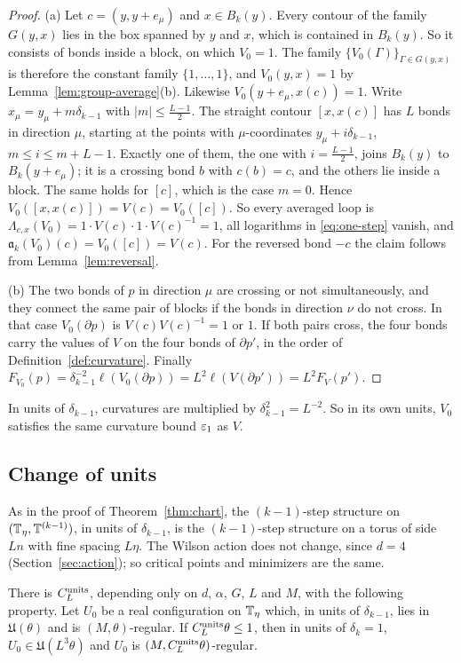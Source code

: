\begin{proof}
(a) Let $c=(y,y+e_\mu)$ and $x\in B_k(y)$. Every contour of the family $G(y,x)$ lies in the box spanned by $y$ and $x$, which is contained in $B_k(y)$. So it consists of bonds inside a block, on which $V_0=1$. The family $\{V_0(\Gamma)\}_{\Gamma\in G(y,x)}$ is therefore the constant family $\{1,\dots,1\}$, and $V_0(y,x)=1$ by Lemma~\ref{lem:group-average}(b). Likewise $V_0(y+e_\mu,x(c))=1$. Write $x_\mu=y_\mu+m\delta_{k-1}$ with $|m|\le\frac{L-1}2$. The straight contour $[x,x(c)]$ has $L$ bonds in direction $\mu$, starting at the points with $\mu$-coordinates $y_\mu+i\delta_{k-1}$, $m\le i\le m+L-1$. Exactly one of them, the one with $i=\frac{L-1}2$, joins $B_k(y)$ to $B_k(y+e_\mu)$; it is a crossing bond $b$ with $c(b)=c$, and the others lie inside a block. The same holds for $[c]$, which is the case $m=0$. Hence $V_0([x,x(c)])=V(c)=V_0([c])$. So every averaged loop is $\Lambda_{c,x}(V_0)=1\cdot V(c)\cdot1\cdot V(c)^{-1}=1$, all logarithms in \eqref{eq:one-step} vanish, and $\mathfrak a_k(V_0)(c)=V_0([c])=V(c)$. For the reversed bond $-c$ the claim follows from Lemma~\ref{lem:reversal}.

(b) The two bonds of $p$ in direction $\mu$ are crossing or not simultaneously, and they connect the same pair of blocks if the bonds in direction $\nu$ do not cross. In that case $V_0(\partial p)$ is $V(c)V(c)^{-1}=1$ or $1$. If both pairs cross, the four bonds carry the values of $V$ on the four bonds of $\partial p'$, in the order of Definition~\ref{def:curvature}. Finally $F_{V_0}(p)=\delta_{k-1}^{-2}\ell(V_0(\partial p))=L^2\ell(V(\partial p'))=L^2F_V(p')$.
\end{proof}

In units of $\delta_{k-1}$, curvatures are multiplied by $\delta_{k-1}^2=L^{-2}$. So in its own units, $V_0$ satisfies the same curvature bound $\varepsilon_1$ as $V$.

\subsection{Change of units}\label{ss:30.2}

As in the proof of Theorem~\ref{thm:chart}, the $(k-1)$-step structure on $(\mathbb T_\eta,\mathbb T^{(k-1)})$, in units of $\delta_{k-1}$, is the $(k-1)$-step structure on a torus of side $Ln$ with fine spacing $L\eta$. The Wilson action does not change, since $d=4$ (Section~\ref{sec:action}); so critical points and minimizers are the same.

\begin{lemma}\label{lem:units}
There is $C^{\rm units}_L$, depending only on $d$, $\alpha$, $G$, $L$ and $M$, with the following property. Let $U_0$ be a real configuration on $\mathbb T_\eta$ which, in units of $\delta_{k-1}$, lies in $\mathfrak U(\theta)$ and is $(M,\theta)$-regular. If $C^{\rm units}_L\theta\le1$, then in units of $\delta_k=1$, $U_0\in\mathfrak U(L^3\theta)$ and $U_0$ is $(M,C^{\rm units}_L\theta)$-regular.
\end{lemma}


